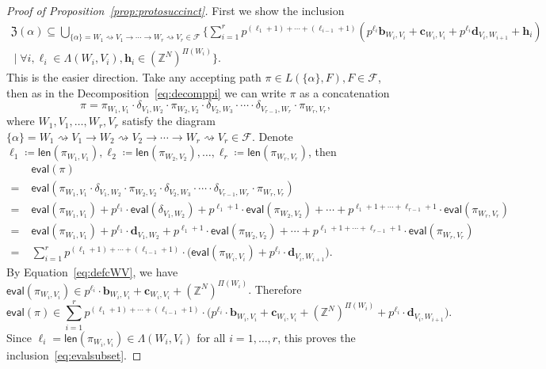 \documentclass[letterpaper, 11pt, thm-restate]{article}
\numberwithin{equation}{section}
\newcommand{\Z}{\mathbb{Z}}
\newcommand{\mF}{\mathcal{F}}
\newcommand{\mZ}{\mathfrak{Z}}
\newcommand{\bb}{\boldsymbol{b}}
\newcommand{\bc}{\boldsymbol{c}}
\newcommand{\bd}{\boldsymbol{d}}
\newcommand{\bh}{\boldsymbol{h}}
\newcommand{\len}{\mathsf{len}}
\newcommand{\eval}{\mathsf{eval}}
\theoremstyle{definition}
\theoremstyle{definition}
\theoremstyle{definition}
\begin{document}
\begin{proof}[Proof of Proposition~\ref{prop:protosuccinct}]
    First we show the inclusion
    \begin{multline}\label{eq:evalsubset}
        \mZ(\alpha) \subseteq \bigcup_{\{\alpha\} = W_1 \rightsquigarrow V_1 \rightarrow \cdots \rightarrow W_r \rightsquigarrow V_r \in \mF} \Bigg\{\sum_{i = 1}^r p^{(\ell_1 + 1) + \cdots + (\ell_{i-1} + 1)} \left(p^{\ell_i} \bb_{W_i, V_i} + \bc_{W_i, V_i} + p^{\ell_i} \bd_{V_i, W_{i+1}} + \bh_i \right) \\
        \;\Bigg|\; \forall i, \ell_i \in \Lambda(W_i, V_i), \bh_i \in (\Z^N)^{\Pi(W_i)} \Bigg\}.
    \end{multline}
    This is the easier direction.
    Take any accepting path $\pi \in L(\{\alpha\}, F), F \in \mF$, then as in the Decomposition~\eqref{eq:decomppi} we can write $\pi$ as a concatenation
    \[
    \pi = \pi_{W_1, V_1} \cdot \delta_{V_1, W_2} \cdot \pi_{W_2, V_2} \cdot \delta_{V_2, W_3} \cdot \cdots \cdot \delta_{V_{r-1}, W_r} \cdot \pi_{W_r, V_r},
    \]
    where $W_1, V_1, \ldots, W_r, V_r$ satisfy the diagram $\{\alpha\} = W_1 \rightsquigarrow V_1 \rightarrow W_2 \rightsquigarrow V_2 \rightarrow \cdots \rightarrow W_r \rightsquigarrow V_r \in \mF$.
    Denote $\ell_1 \coloneqq \len(\pi_{W_1, V_1}), \ell_2 \coloneqq \len(\pi_{W_2, V_2}), \ldots, \ell_r \coloneqq \len(\pi_{W_r, V_r})$, then
    \begin{align*}
        &\;\eval(\pi) \\
        = &\; \eval\left(\pi_{W_1, V_1} \cdot \delta_{V_1, W_2} \cdot \pi_{W_2, V_2} \cdot \delta_{V_2, W_3} \cdot \cdots \cdot \delta_{V_{r-1}, W_r} \cdot \pi_{W_r, V_r}\right) \\
        = &\; \eval\left(\pi_{W_1, V_1}\right) + p^{\ell_1} \cdot \eval\left(\delta_{V_1, W_2}\right) + p^{\ell_1 + 1} \cdot \eval\left(\pi_{W_2, V_2}\right) + \cdots + p^{\ell_1+1+ \cdots + \ell_{r-1}+1} \cdot \eval\left(\pi_{W_r, V_r}\right) \\ 
        = &\; \eval\left(\pi_{W_1, V_1}\right) + p^{\ell_1} \cdot \bd_{V_1, W_2} + p^{\ell_1 + 1} \cdot \eval\left(\pi_{W_2, V_2}\right) + \cdots + p^{\ell_1+1+ \cdots + \ell_{r-1}+1} \cdot \eval\left(\pi_{W_r, V_r}\right) \\
        = &\; \sum_{i=1}^{r} p^{(\ell_1+1)+ \cdots + (\ell_{i-1}+1)} \cdot \Big(\eval(\pi_{W_i, V_i}) + p^{\ell_i} \cdot \bd_{V_i, W_{i+1}}\Big).
    \end{align*}
    By Equation~\eqref{eq:defcWV}, we have $\eval(\pi_{W_i, V_i}) \in p^{\ell_i} \cdot \bb_{W_i, V_i} + \bc_{W_i, V_i} + (\Z^N)^{\Pi(W_i)}$.
    Therefore
    \[
    \eval(\pi) \in \sum_{i=1}^{r} p^{(\ell_1+1)+ \cdots + (\ell_{i-1}+1)} \cdot \Big(p^{\ell_i} \cdot \bb_{W_i, V_i} + \bc_{W_i, V_i} + (\Z^N)^{\Pi(W_i)} + p^{\ell_i} \cdot \bd_{V_i, W_{i+1}}\Big).
    \]
    Since $\ell_i = \len(\pi_{W_i, V_i}) \in \Lambda(W_i, V_i)$ for all $i = 1, \ldots, r$, this proves the inclusion~\eqref{eq:evalsubset}.


\end{proof}
\end{document}
